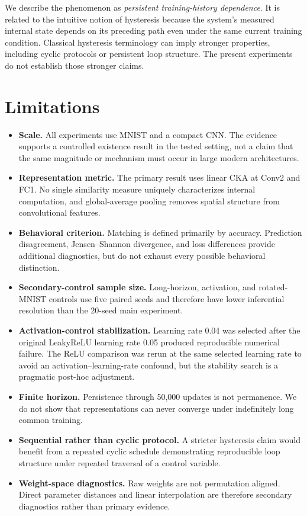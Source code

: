 \documentclass[11pt,a4paper]{article}
\begin{document}
We describe the phenomenon as \emph{persistent training-history dependence}. It is related to the intuitive notion of hysteresis because the system's measured internal state depends on its preceding path even under the same current training condition. Classical hysteresis terminology can imply stronger properties, including cyclic protocols or persistent loop structure. The present experiments do not establish those stronger claims.

\section{Limitations}

\begin{itemize}
  \item \textbf{Scale.} All experiments use MNIST and a compact CNN. The evidence supports a controlled existence result in the tested setting, not a claim that the same magnitude or mechanism must occur in large modern architectures.
  \item \textbf{Representation metric.} The primary result uses linear CKA at Conv2 and FC1. No single similarity measure uniquely characterizes internal computation, and global-average pooling removes spatial structure from convolutional features.
  \item \textbf{Behavioral criterion.} Matching is defined primarily by accuracy. Prediction disagreement, Jensen--Shannon divergence, and loss differences provide additional diagnostics, but do not exhaust every possible behavioral distinction.
  \item \textbf{Secondary-control sample size.} Long-horizon, activation, and rotated-MNIST controls use five paired seeds and therefore have lower inferential resolution than the 20-seed main experiment.
  \item \textbf{Activation-control stabilization.} Learning rate 0.04 was selected after the original LeakyReLU learning rate 0.05 produced reproducible numerical failure. The ReLU comparison was rerun at the same selected learning rate to avoid an activation--learning-rate confound, but the stability search is a pragmatic post-hoc adjustment.
  \item \textbf{Finite horizon.} Persistence through 50,000 updates is not permanence. We do not show that representations can never converge under indefinitely long common training.
  \item \textbf{Sequential rather than cyclic protocol.} A stricter hysteresis claim would benefit from a repeated cyclic schedule demonstrating reproducible loop structure under repeated traversal of a control variable.
  \item \textbf{Weight-space diagnostics.} Raw weights are not permutation aligned. Direct parameter distances and linear interpolation are therefore secondary diagnostics rather than primary evidence.
\end{itemize}
\end{document}
